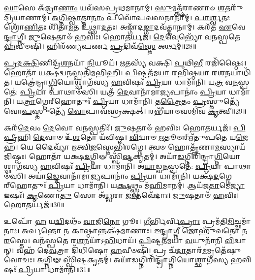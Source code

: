 \-\ul{𑌘𑌾}\-𑌸𑍇 𑌅᳴𑌜𑍍𑌰𑌾\-\ul{𑌣𑌾𑌂} 𑌯𑌵᳴𑌸𑌪𑍍𑌰𑌥𑌮𑌾𑌨𑌾𑌮𑍍।
\-\ul{𑌸𑍁}\-𑌮𑌤𑍍𑌕𑍍𑌷᳴𑌰𑌾𑌣𑌾𑍞 \ul{𑌶}\-𑌤𑌰𑍁᳴𑌦𑍍𑌰𑌿\-𑌯𑌾𑌣𑌾𑌮𑍍।
\-\ul{𑌅}\-\-\ul{𑌗𑍍𑌨𑌿}\-\-\ul{𑌷𑍍𑌵𑌾}\-𑌤𑍍𑌤𑌾\-\ul{𑌨𑌾𑌂} 𑌪𑍀𑌵𑍋᳴𑌪𑌵𑌸𑌨𑌾𑌨𑌾𑌮𑍍।
\-\ul{𑌪𑌾}\-\-\ul{𑌰𑍍𑌶𑍍𑌵}\-𑌤𑌃 𑌶𑍍𑌰𑍋᳴\-\ul{𑌣𑌿}\-𑌤𑌃 𑌶𑌿᳴𑌤𑌾\-\ul{𑌮}\-𑌤 𑌉᳴𑌥𑍍𑌸𑌾\-\ul{𑌦}\-𑌤𑌃।
𑌅𑌙𑍍𑌗𑌾᳴𑌦\-\ul{𑌙𑍍𑌗𑌾}\-𑌦𑌵᳴𑌤𑍍𑌤𑌾𑌨𑌾𑌮𑍍।
𑌕𑌰᳴𑌤 \ul{𑌏}\-𑌵𑍇\-\ul{𑌨𑍍𑌦𑍍𑌰𑌾}\-𑌗𑍍𑌨𑍀।
\-\ul{𑌜𑍁}\-𑌷𑍇𑌤𑌾𑍞᳴ \ul{𑌹}\-𑌵𑌿𑌃।
𑌹𑍋\-\ul{𑌤}\-𑌰𑍍𑌯𑌜᳴।
\-\ul{𑌦𑍇}\-𑌵𑍇𑌭𑍍𑌯𑍋᳴ 𑌵𑌨𑌸𑍍𑌪𑌤𑍇 \ul{𑌹}\-𑌵𑍀𑍞𑌷𑌿᳴।
𑌹𑌿𑌰᳴𑌣𑍍𑌯𑌪𑌰𑍍𑌣 \ul{𑌪𑍍𑌰}\-𑌦𑌿𑌵᳴\-\ul{𑌸𑍍𑌤𑍇} 𑌅𑌰𑍍𑌥𑌮𑍍॑॥28॥

\-\ul{𑌪𑍍𑌰}\-\-\ul{𑌦}\-\-\ul{𑌕𑍍𑌷𑌿}\-𑌣𑌿𑌦𑍍𑌰᳴\-\ul{𑌶}\-𑌨𑌯𑌾᳴ \ul{𑌨𑌿}\-𑌯𑍂𑌯᳴।
\-\ul{𑌋}\-𑌤𑌸𑍍𑌯᳴ 𑌵𑌕𑍍𑌷𑌿 \ul{𑌪}\-𑌥𑌿\-\ul{𑌭𑍀} 𑌰𑌜𑌿᳴𑌷𑍍𑌠𑍈𑌃।
𑌹𑍋𑌤𑌾᳴ 𑌯\-\ul{𑌕𑍍𑌷}\-𑌦𑍍𑌵\-\ul{𑌨}\-𑌸𑍍𑌪𑌤𑌿᳴\-\ul{𑌮}\-𑌭𑌿𑌹𑌿।
\-\ul{𑌪𑌿}\-𑌷𑍍𑌟𑌤᳴𑌮\-\ul{𑌯𑌾} 𑌰𑌭𑌿᳴𑌷𑍍𑌠𑌯𑌾 𑌰\-\ul{𑌶}\-𑌨𑌯𑌾𑌧𑌿᳴𑌤।
𑌯𑌤𑍍𑌰𑍇॑𑌨𑍍𑌦𑍍𑌰𑌾\-\ul{𑌗𑍍𑌨𑌿}\-𑌯𑍋𑌶𑍍𑌛𑌾𑌗᳴𑌸𑍍𑌯 \ul{𑌹}\-𑌵𑌿𑌷𑌃᳴ \ul{𑌪𑍍𑌰𑌿}\-𑌯𑌾 𑌧𑌾𑌮𑌾᳴𑌨𑌿।
𑌯\-\ul{𑌤𑍍𑌰} 𑌵\-\ul{𑌨}\-𑌸𑍍𑌪𑌤𑍇॑: \ul{𑌪𑍍𑌰𑌿}\-𑌯𑌾 𑌪𑌾𑌥𑌾𑍞᳴𑌸𑌿।
𑌯𑌤𑍍𑌰᳴ \ul{𑌦𑍇}\-𑌵𑌾𑌨𑌾᳴𑌮𑌾\-\ul{𑌜𑍍𑌯}\-𑌪𑌾𑌨𑌾𑌂॑ \ul{𑌪𑍍𑌰𑌿}\-𑌯𑌾 𑌧𑌾𑌮𑌾᳴𑌨𑌿।
𑌯\-\ul{𑌤𑍍𑌰𑌾}\-𑌗𑍍𑌨𑍇𑌰𑍍‌\mbox{}𑌹𑍋𑌤𑍁𑌃᳴ \ul{𑌪𑍍𑌰𑌿}\-𑌯𑌾 𑌧𑌾𑌮𑌾᳴𑌨𑌿।
𑌤\-\ul{𑌤𑍍𑌰𑍈}\-𑌤𑌂 \ul{𑌪𑍍𑌰}\-𑌸𑍍𑌤𑍁𑌤𑍍𑌯𑍇᳴𑌵𑍋\-\ul{𑌪}\-𑌸𑍍𑌤𑍁𑌤𑍍𑌯𑍇᳴ \ul{𑌵𑍋}\-𑌪𑌾𑌵᳴𑌸𑍍𑌰𑌕𑍍𑌷𑌤𑍍।
𑌰𑌭𑍀᳴𑌯𑌾𑍞𑌸𑌮𑌿𑌵 \ul{𑌕𑍃}\-𑌤𑍍𑌵𑍀॥29॥

𑌕𑌰᳴\-\ul{𑌦𑍇}\-𑌵𑌂 \ul{𑌦𑍇}\-𑌵𑍋 𑌵\-\ul{𑌨}\-𑌸𑍍𑌪𑌤𑌿𑌃᳴।
\-\ul{𑌜𑍁}\-𑌷𑌤𑌾𑍞᳴ \ul{𑌹}\-𑌵𑌿𑌃।
𑌹𑍋\-\ul{𑌤}\-𑌰𑍍𑌯𑌜᳴।
\-\ul{𑌪𑌿}\-\-\ul{𑌪𑍍𑌰𑍀}\-𑌹𑌿 \ul{𑌦𑍇}\-𑌵𑌾𑍞 𑌉᳴\-\ul{𑌶}\-𑌤𑍋 𑌯᳴𑌵𑌿𑌷𑍍𑌠।
\-\ul{𑌵𑌿}\-𑌦𑍍𑌵𑌾𑍞 \ul{𑌋}\-𑌤𑍂𑍞𑌰𑍍\mbox{}𑌋᳴𑌤𑍁𑌪𑌤𑍇 𑌯\-\ul{𑌜𑍇}\-𑌹।
𑌯𑍇 𑌦𑍈𑌵𑍍𑌯𑌾᳴ \ul{𑌋}\-𑌤𑍍𑌵𑌿\-\ul{𑌜}\-𑌸𑍍𑌤𑍇𑌭𑌿᳴𑌰𑌗𑍍𑌨𑍇।
𑌤𑍍𑌵𑍞 𑌹𑍋𑌤𑍄᳴𑌣𑌾\-\ul{𑌮}\-𑌸𑍍𑌯𑌾𑌯᳴𑌜𑌿𑌷𑍍𑌠𑌃।
𑌹𑍋𑌤𑌾᳴ 𑌯𑌕𑍍𑌷\-\ul{𑌦}\-𑌗𑍍𑌨𑌿𑍟 𑌸𑍍𑌵𑌿᳴\-\ul{𑌷𑍍𑌟}\-𑌕𑍃𑌤𑌮𑍍॑।
𑌅𑌯𑌾᳴\-\ul{𑌡}\-𑌗𑍍𑌨𑌿𑌰𑌿᳴𑌨𑍍𑌦𑍍𑌰𑌾\-\ul{𑌗𑍍𑌨𑌿}\-𑌯𑍋𑌶𑍍𑌛𑌾𑌗᳴𑌸𑍍𑌯 \ul{𑌹}\-𑌵𑌿𑌷𑌃᳴ \ul{𑌪𑍍𑌰𑌿}\-𑌯𑌾 𑌧𑌾𑌮𑌾᳴𑌨𑌿।
𑌅\-\ul{𑌯𑌾}\-𑌡𑍍𑌵\-\ul{𑌨}\-𑌸𑍍𑌪𑌤𑍇॑: \ul{𑌪𑍍𑌰𑌿}\-𑌯𑌾 𑌪𑌾𑌥𑌾𑍞᳴𑌸𑌿।
𑌅𑌯𑌾॑\-\ul{𑌡𑍍𑌦𑍇}\-𑌵𑌾𑌨𑌾᳴𑌮𑌾\-\ul{𑌜𑍍𑌯}\-𑌪𑌾𑌨𑌾𑌂॑ \ul{𑌪𑍍𑌰𑌿}\-𑌯𑌾 𑌧𑌾𑌮𑌾᳴𑌨𑌿।
𑌯𑌕𑍍𑌷᳴\-\ul{𑌦}\-𑌗𑍍𑌨𑍇𑌰𑍍‌\mbox{}𑌹𑍋𑌤𑍁𑌃᳴ \ul{𑌪𑍍𑌰𑌿}\-𑌯𑌾 𑌧𑌾𑌮𑌾᳴𑌨𑌿।
𑌯\-\ul{𑌕𑍍𑌷}\-𑌥𑍍𑌸𑍍𑌵𑌂 𑌮᳴\-\ul{𑌹𑌿}\-𑌮𑌾𑌨𑌮𑍍॑।
𑌆𑌯᳴𑌜\-\ul{𑌤𑌾}\-𑌮𑍇\-\ul{𑌜𑍍𑌯𑌾} 𑌇𑌷𑌃᳴।
\-\ul{𑌕𑍃}\-𑌣𑍋\-\ul{𑌤𑍁} 𑌸𑍋 𑌅᳴\-\ul{𑌧𑍍𑌵}\-𑌰𑌾 \ul{𑌜𑌾}\-𑌤𑌵𑍇᳴𑌦𑌾𑌃।
\-\ul{𑌜𑍁}\-𑌷𑌤𑌾𑍞᳴ \ul{𑌹}\-𑌵𑌿𑌃।
𑌹𑍋\-\ul{𑌤}\-𑌰𑍍𑌯𑌜᳴॥30॥\anuvakamend[\-\ul{𑌨𑍂}\-𑌨𑌮𑌰𑍍𑌥𑌂᳴ \ul{𑌕𑍃}\-𑌤𑍍𑌵𑍀 𑌪𑌾𑌥𑌾𑍞᳴𑌸𑌿 \ul{𑌸}\-𑌪𑍍𑌤 𑌚᳴]

𑌉𑌪𑍋᳴ \ul{𑌹} 𑌯\-\ul{𑌦𑍍𑌵𑌿}\-𑌦𑌥𑌂᳴ \ul{𑌵𑌾}\-𑌜𑌿\-\ul{𑌨𑍋} 𑌗𑍂𑌃।
\-\ul{𑌗𑍀}\-𑌰𑍍𑌭𑌿𑌰𑍍𑌵𑌿\-\ul{𑌪𑍍𑌰𑌾𑌃} 𑌪𑍍𑌰𑌮᳴𑌤𑌿\-\ul{𑌮𑌿}\-𑌚𑍍𑌛𑌮𑌾᳴𑌨𑌾𑌃।
\-\ul{𑌅}\-𑌰𑍍𑌵\-\ul{𑌨𑍍𑌤𑍋} 𑌨 𑌕𑌾\-\ul{𑌷𑍍𑌠𑌾}\-𑌨𑍍𑌨𑌕𑍍𑌷᳴𑌮𑌾𑌣𑌾𑌃।
\-\ul{𑌇}\-\-\ul{𑌨𑍍𑌦𑍍𑌰𑌾}\-𑌗𑍍𑌨𑍀 𑌜𑍋𑌹𑍁᳴𑌵\-\ul{𑌤𑍋} 𑌨\-\ul{𑌰}\-𑌸𑍍𑌤𑍇।
𑌵𑌨᳴𑌸𑍍𑌪𑌤𑍇 𑌰\-\ul{𑌶}\-𑌨𑌯𑌾᳴\-𑌽\-\ul{𑌭𑌿}\-𑌧𑌾𑌯᳴।
\-\ul{𑌪𑌿}\-𑌷𑍍𑌟𑌤᳴𑌮𑌯𑌾 \ul{𑌵}\-𑌯𑍁𑌨𑌾᳴𑌨𑌿 \ul{𑌵𑌿}\-𑌦𑍍𑌵𑌾𑌨𑍍।
𑌵𑌹᳴ 𑌦𑍇\-\ul{𑌵}\-𑌤𑍍𑌰𑌾 𑌦𑌿᳴𑌧𑌿𑌷𑍋 \ul{𑌹}\-𑌵𑍀𑍞𑌷𑌿᳴।
𑌪𑍍𑌰 𑌚᳴\-\ul{𑌦𑌾}\-𑌤𑌾𑌰᳴\-\ul{𑌮}\-𑌮𑍃𑌤𑍇᳴𑌷𑍁 𑌵𑍋𑌚𑌃।
\-\ul{𑌅}\-𑌗𑍍𑌨𑌿𑍟 𑌸𑍍𑌵𑌿᳴\-\ul{𑌷𑍍𑌟}\-𑌕𑍃𑌤𑌮𑍍॑।
𑌅𑌯𑌾᳴\-\ul{𑌡}\-𑌗𑍍𑌨𑌿𑌰𑌿᳴𑌨𑍍𑌦𑍍𑌰𑌾\-\ul{𑌗𑍍𑌨𑌿}\-𑌯𑍋𑌶𑍍𑌛𑌾𑌗᳴𑌸𑍍𑌯 \ul{𑌹}\-𑌵𑌿𑌷𑌃᳴ \ul{𑌪𑍍𑌰𑌿}\-𑌯𑌾 𑌧𑌾𑌮𑌾᳴𑌨𑌿॥31॥

